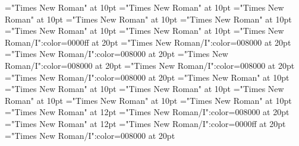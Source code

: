 \documentclass[a4paper]{article}
\begin{document}
 
\pagestyle{plain} 
\font\examplelastoftypearticledictionary="Times New Roman" at 10pt
\font\exampleuselastoftypearticledictionary="Times New Roman" at 10pt
\font\examplefirstoftypearticledictionary="Times New Roman" at 10pt
\font\exampleusefirstoftypearticledictionary="Times New Roman" at 10pt
\font\firstoftypelastoftypenotearticledictionary="Times New Roman" at 10pt
\font{}="Times New Roman" at 10pt
\font\firstoftypegrammarcategorylastoftypearticledictionary="Times New Roman" at 10pt
\font\pronunciationenUKpronunciationenUSbeforearticledictionary="Times New Roman/I":color=0000ff at 20pt
\font\lastoftypepronunciationenUKarticledictionary="Times New Roman/I":color=008000 at 20pt
\font\pronunciationenUSfirstoftypebeforearticledictionary="Times New Roman/I":color=008000 at 20pt
\font\firstoftypepronunciationenUSarticledictionary="Times New Roman/I":color=008000 at 20pt
\font\pronunciationfirstoftypebeforearticledictionary="Times New Roman/I":color=008000 at 20pt
\font\firstoftypepronunciationenUKarticledictionary="Times New Roman/I":color=008000 at 20pt
\font\firstoftypelastoftyperelationsynonymarticledictionary="Times New Roman" at 10pt
\font\firstoftypegrammarrequireslastoftypearticledictionary="Times New Roman" at 10pt
\font\firstoftypeheadwordlastoftypearticledictionary="Times New Roman" at 10pt
\font\articledictionary="Times New Roman" at 10pt
\font\headsectionletterdictionary="Times New Roman" at 10pt
\font\sectionletterdictionary="Times New Roman" at 10pt
\font\pronunciationenUSbefore="Times New Roman" at 12pt
\font\pronunciationenUSpronunciationbefore="Times New Roman/I":color=008000 at 20pt
\font\pronunciationenUSfirstoftypebefore="Times New Roman" at 12pt
\font\pronunciationenUKpronunciationenUSbefore="Times New Roman/I":color=0000ff at 20pt
\font\pronunciationenUSpronunciationarticlebefore="Times New Roman/I":color=008000 at 20pt
\pagestyle{fancy} 


\end{document}
